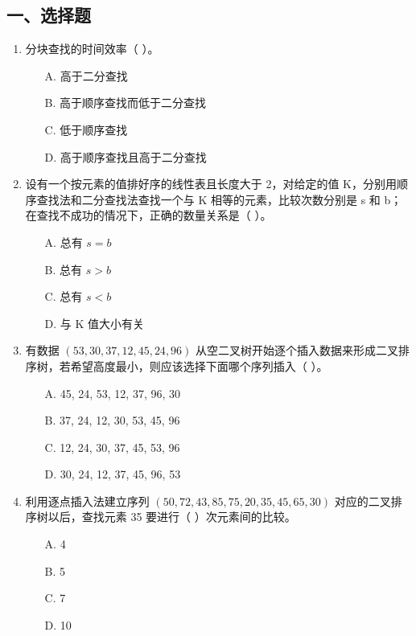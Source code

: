 \documentclass[12pt, a4paper]{article}
\begin{document}
\subsection*{一、选择题}
\begin{enumerate}
    \item 分块查找的时间效率（ ）。
    \begin{enumerate}
        \item[A.] 高于二分查找
        \item[B.] 高于顺序查找而低于二分查找
        \item[C.] 低于顺序查找
        \item[D.] 高于顺序查找且高于二分查找
    \end{enumerate}
    
    \item 设有一个按元素的值排好序的线性表且长度大于 2，对给定的值 K，分别用顺序查找法和二分查找法查找一个与 K 相等的元素，比较次数分别是 s 和 b；在查找不成功的情况下，正确的数量关系是（ ）。
    \begin{enumerate}
        \item[A.] 总有 $s=b$
        \item[B.] 总有 $s>b$
        \item[C.] 总有 $s<b$
        \item[D.] 与 K 值大小有关
    \end{enumerate}
    
    \item 有数据 $(53, 30, 37, 12, 45, 24, 96)$ 从空二叉树开始逐个插入数据来形成二叉排序树，若希望高度最小，则应该选择下面哪个序列插入（ ）。
    \begin{enumerate}
        \item[A.] 45, 24, 53, 12, 37, 96, 30
        \item[B.] 37, 24, 12, 30, 53, 45, 96
        \item[C.] 12, 24, 30, 37, 45, 53, 96
        \item[D.] 30, 24, 12, 37, 45, 96, 53
    \end{enumerate}
    
    \item 利用逐点插入法建立序列 $(50, 72, 43, 85, 75, 20, 35, 45, 65, 30)$ 对应的二叉排序树以后，查找元素 35 要进行（ ）次元素间的比较。
    \begin{enumerate}
        \item[A.] 4
        \item[B.] 5
        \item[C.] 7
        \item[D.] 10
    \end{enumerate}
    

\end{enumerate}
\end{document}

